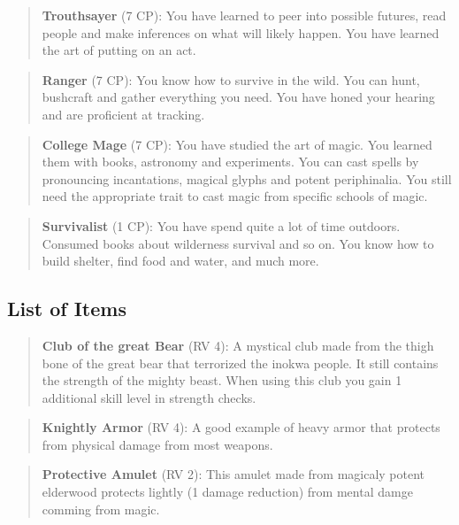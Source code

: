 \documentclass[11pt]{article}
\begin{document}
{\begin{multicols}{2}[]
\begin{quote}
\textbf{Trouthsayer} (7 CP): You have learned to peer into possible futures, read people and make inferences on what will likely happen. You have learned the art of putting on an act. 
\end{quote}

\begin{quote}
\textbf{Ranger} (7 CP): You know how to survive in the wild. You can hunt, bushcraft and gather everything you need. You have honed your hearing and are proficient at tracking.
\end{quote}

\begin{quote}
\textbf{College Mage} (7 CP): You have studied the art of magic. You learned them with books, astronomy and experiments. You can cast spells by pronouncing incantations, magical glyphs and potent periphinalia. You still need the appropriate trait to cast magic from specific schools of magic.
\end{quote}

\begin{quote}
\textbf{Survivalist} (1 CP): You have spend quite a lot of time outdoors. Consumed books about wilderness survival and so on. You know how to build shelter, find food and water, and much more. 
\end{quote}


\subsection{List of Items}
\label{sec:org2396259}
\begin{quote}
\textbf{Club of the great Bear} (RV 4): A mystical club made from the thigh bone of the great bear that terrorized the inokwa people. It still contains the strength of the mighty beast. When using this club you gain 1 additional skill level in strength checks.
\end{quote}

\begin{quote}
\textbf{Knightly Armor} (RV 4): A good example of heavy armor that protects from physical damage from most weapons.
\end{quote}

\begin{quote}
\textbf{Protective Amulet} (RV 2): This amulet made from magicaly potent elderwood protects lightly (1 damage reduction) from mental damge comming from magic.
\end{quote}


\end{multicols}}
\end{document}
